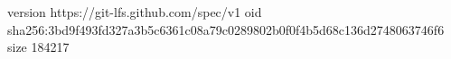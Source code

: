 version https://git-lfs.github.com/spec/v1
oid sha256:3bd9f493fd327a3b5c6361c08a79c0289802b0f0f4b5d68c136d2748063746f6
size 184217
